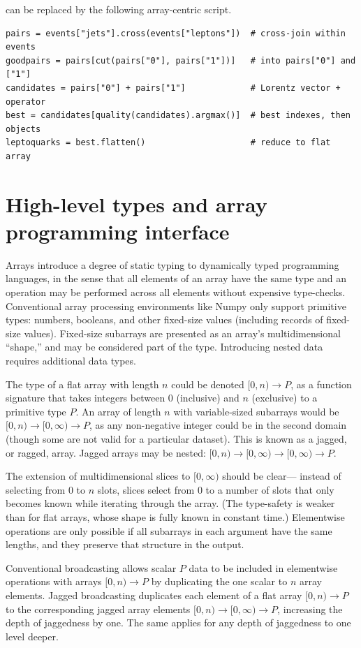 \documentclass{webofc}
\begin{document}
\noindent can be replaced by the following array-centric script.

{\small\begin{verbatim}
pairs = events["jets"].cross(events["leptons"])  # cross-join within events
goodpairs = pairs[cut(pairs["0"], pairs["1"])]   # into pairs["0"] and ["1"]
candidates = pairs["0"] + pairs["1"]             # Lorentz vector + operator
best = candidates[quality(candidates).argmax()]  # best indexes, then objects
leptoquarks = best.flatten()                     # reduce to flat array
\end{verbatim}
}

\section{High-level types and array programming interface}

Arrays introduce a degree of static typing to dynamically typed programming languages, in the sense that all elements of an array have the same type and an operation may be performed across all elements without expensive type-checks. Conventional array processing environments like Numpy only support primitive types: numbers, booleans, and other fixed-size values (including records of fixed-size values). Fixed-size subarrays are presented as an array's multidimensional ``shape,'' and may be considered part of the type. Introducing nested data requires additional data types.

The type of a flat array with length $n$ could be denoted $[0, n) \to P$, as a function signature that takes integers between $0$ (inclusive) and $n$ (exclusive) to a primitive type $P$. An array of length $n$ with variable-sized subarrays would be $[0, n) \to [0, \infty) \to P$, as any non-negative integer could be in the second domain (though some are not valid for a particular dataset). This is known as a jagged, or ragged, array. Jagged arrays may be nested: $[0, n) \to [0, \infty) \to [0, \infty) \to P$.

The extension of multidimensional slices to $[0, \infty)$ should be clear--- instead of selecting from $0$ to $n$ slots, slices select from $0$ to a number of slots that only becomes known while iterating through the array. (The type-safety is weaker than for flat arrays, whose shape is fully known in constant time.) Elementwise operations are only possible if all subarrays in each argument have the same lengths, and they preserve that structure in the output.

Conventional broadcasting allows scalar $P$ data to be included in elementwise operations with arrays $[0, n) \to P$ by duplicating the one scalar to $n$ array elements. Jagged broadcasting duplicates each element of a flat array $[0, n) \to P$ to the corresponding jagged array elements $[0, n) \to [0, \infty) \to P$, increasing the depth of jaggedness by one. The same applies for any depth of jaggedness to one level deeper.
\end{document}

